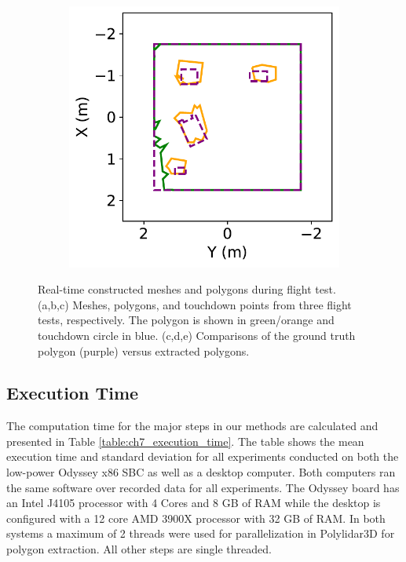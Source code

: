 \begin{figure}[!htb]
\begin{subfigure}[t]{.32\linewidth}
    \caption{\label{fig:ch7_flight_poly_b}}
  \end{subfigure}
  \begin{subfigure}[t]{.32\linewidth}
    \centering  \includegraphics[clip,trim=0cm 0cm 0cm 0cm,width=.99\linewidth]{chapter_7_experiments/imgs/flight_poly_3.pdf}
    \caption{\label{fig:ch7_flight_poly_c}}
  \end{subfigure}
  \caption[Real-time constructed meshes and polygons during flight test]{Real-time constructed meshes and polygons during flight test. (a,b,c) Meshes, polygons, and touchdown points from three flight tests, respectively. The polygon is shown in green/orange and touchdown circle in blue. (c,d,e) Comparisons of the ground truth polygon (purple) versus extracted polygons. }\label{fig:ch7_mesh_flight}
\end{figure}


\subsection{Execution Time} \label{sec:ch7_results_execution_time}

The computation time for the major steps in our methods are calculated and presented in Table \ref{table:ch7_execution_time}. The table shows the mean execution time and standard deviation for all experiments conducted on both the low-power Odyssey x86 \ac{SBC} as well as a desktop computer. Both computers ran the same software over recorded data for all experiments. The Odyssey board has an Intel J4105 processor with 4 Cores and 8 GB of RAM while the desktop is configured with a 12 core AMD 3900X processor with 32 GB of RAM. In both systems a maximum of 2 threads were used for parallelization in Polylidar3D for polygon extraction. All other steps are single threaded. 

